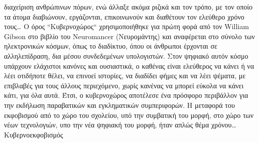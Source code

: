 \documentclass[12pt,a4paper]{book}
\begin{document}
διαχείριση ανθρώπινων πόρων, ενώ άλλαξε ακόμα ριζικά και τον τρόπο, με τον οποίο
τα άτομα διαβιώνουν, εργάζονται, επικοινωνούν και διαθέτουν τον ελεύθερο χρόνο
τους\ldots
\newline\setlength{\parindent}{20pt}\indent Ο όρος ``Κυβερνοχώρος``
χρησιμοποιήθηκε για πρώτη φορά από τον William Gibson στο βιβλίο του Neuromancer (Νευρομάντης) και
αναφέρεται στο σύνολο των ηλεκτρονικών κόσμων, όπως το διαδίκτυο, όπου οι
άνθρωποι έρχονται σε αλληλεπίδραση, δια μέσου συνδεδεμένων υπολογιστών. Στον
ψηφιακό αυτόν κόσμο υπάρχουν ελάχιστοι κανόνες και ουσιαστικά, ο καθένας είναι
ελεύθερος να κάνει ή να λέει οτιδήποτε θέλει, να επινοεί ιστορίες, να διαδίδει
φήμες και να λέει ψέματα, με επιβλαβές για τους άλλους περιεχόμενο, χωρίς
κανένας να μπορεί εύκολα να κάνει κάτι, για όλα αυτά. Έτσι, ο κυβερνοχώρος
αποτέλεσε ένα πρόσφορο περιβάλλον για την εκδήλωση παραβατικών και εγκληματικών
συμπεριφορών. Η μεταφορά του εκφοβισμού από το χώρο του σχολείου, υπό την
συμβατική του μορφή, στο χώρο των νέων τεχνολογιών, υπο την νέα ψηφιακή του
μορφή, ήταν απλώς θέμα χρόνου\ldots
\newline\setlength{\parindent}{20pt}\indent Κυβερνοεκφοβισμός
\end{document}
